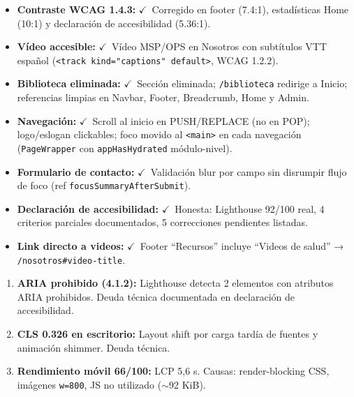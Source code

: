 \documentclass[12pt, a4paper]{article}
\newcommand{\cmark}{\textcolor{successgreen}{$\checkmark$}}
\begin{document}
\begin{successbox}
\begin{itemize}
  \item \textbf{Contraste WCAG 1.4.3:} \cmark~Corregido en footer (7.4:1), estadísticas Home (10:1) y declaración de accesibilidad (5.36:1).
  \item \textbf{Vídeo accesible:} \cmark~Vídeo MSP/OPS en Nosotros con subtítulos VTT español (\texttt{<track kind="captions" default>}, WCAG 1.2.2).
  \item \textbf{Biblioteca eliminada:} \cmark~Sección eliminada; \texttt{/biblioteca} redirige a Inicio; referencias limpias en Navbar, Footer, Breadcrumb, Home y Admin.
  \item \textbf{Navegación:} \cmark~Scroll al inicio en PUSH/REPLACE (no en POP); logo/eslogan clickables; foco movido al \texttt{<main>} en cada navegación (\texttt{PageWrapper} con \texttt{appHasHydrated} módulo-nivel).
  \item \textbf{Formulario de contacto:} \cmark~Validación blur por campo sin disrumpir flujo de foco (ref \texttt{focusSummaryAfterSubmit}).
  \item \textbf{Declaración de accesibilidad:} \cmark~Honesta: Lighthouse 92/100 real, 4 criterios parciales documentados, 5 correcciones pendientes listadas.
  \item \textbf{Link directo a videos:} \cmark~Footer ``Recursos'' incluye ``Videos de salud'' → \texttt{/nosotros\#video-title}.
\end{itemize}
\end{successbox}

\begin{warnbox}
\begin{enumerate}
  \item \textbf{ARIA prohibido (4.1.2):} Lighthouse detecta 2 elementos con atributos ARIA prohibidos. Deuda técnica documentada en declaración de accesibilidad.
  \item \textbf{CLS 0.326 en escritorio:} Layout shift por carga tardía de fuentes y animación shimmer. Deuda técnica.
  \item \textbf{Rendimiento móvil 66/100:} LCP 5,6 s. Causas: render-blocking CSS, imágenes \texttt{w=800}, JS no utilizado ($\sim$92 KiB).
\end{enumerate}
\end{warnbox}

\end{document}
